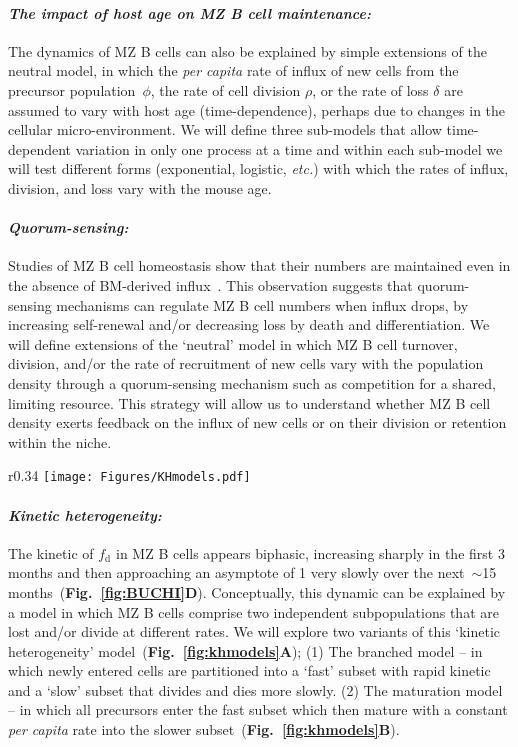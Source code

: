 \documentclass[11pt]{article}
\newcommand{\para}[1]{\vspace*{-4.5mm}\paragraph{#1}}
\begin{document}
\para{\textit{The impact of host age on MZ B cell maintenance:}}
The dynamics of MZ B cells can also be explained by simple extensions of the neutral model, in which the \textit{per capita} rate of influx of new cells from the precursor population~$\phi$, the rate of cell division $\rho$, or the rate of loss $\delta$  are assumed to vary with host age (time-dependence), perhaps due to changes in  the cellular micro-environment.
We will define three sub-models that allow time-dependent variation in only one process at a time and within each sub-model we will test different forms (exponential, logistic, \textit{etc.}) with which the rates of influx, division, and loss vary with the mouse age.

\para{\textit{Quorum-sensing:}}
Studies of MZ B cell homeostasis show that their numbers are maintained even in the absence of BM-derived influx~\cite{Hao_2001, Carvalho_2001}.
This observation suggests that quorum-sensing mechanisms can regulate MZ B cell numbers when influx drops, by increasing self-renewal and/or decreasing  loss by death and differentiation. 
We will define extensions of the `neutral' model in which MZ B cell turnover, division, and/or the rate of recruitment of new cells vary with the population density through a quorum-sensing mechanism such as competition for a shared, limiting resource.
This strategy will allow us to understand whether MZ B cell density %
exerts feedback on the influx of new cells or on their division or retention within the niche.

\begin{wrapfigure}{r}{0.34\textwidth}
\centering
\vspace*{-4mm}
\texttt{[image: Figures/KHmodels.pdf]}
\vspace*{-7mm}
\caption{{Models assuming kinetic heterogeneity in the MZ B cell compartment.}}%
\label{fig:khmodels}
\vspace*{-6mm}
\end{wrapfigure}
\para{\textit{Kinetic heterogeneity:}}
The kinetic of $f_\text{d}$ in MZ B cells appears biphasic, increasing  sharply in the first 3 months and then approaching an asymptote of 1 very slowly over the next~$\sim$15 months~(\textbf{Fig.~\ref{fig:BUCHI}D}).
Conceptually, this dynamic can be explained by a model in which MZ B cells comprise two independent subpopulations that are lost and/or divide at different rates. 
We will explore two variants of this `kinetic heterogeneity' model~(\textbf{Fig.~\ref{fig:khmodels}A});
(1) The branched model --  in which newly entered cells are partitioned into a `fast' subset with rapid kinetic and a `slow' subset that divides and dies more slowly.
(2) The maturation model --  in which all precursors enter the fast subset which then mature with a constant \textit{per capita} rate into the slower subset~(\textbf{Fig.~\ref{fig:khmodels}B}).
\end{document}
